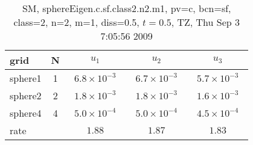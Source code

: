 \begin{table}[hbt]\tableFont %
\begin{center}
\begin{tabular}{|l|c|c|c|c|} \hline 
grid  & N &  $u_1$ & $u_2$ & $u_3$  \\ \hline 
             sphere1 &     1 & ~$6.8\times10^{ -3}$~ & ~$6.7\times10^{ -3}$~ & ~$5.7\times10^{ -3}$~  \\ \hline
             sphere2 &     2 & ~$1.8\times10^{ -3}$~ & ~$1.8\times10^{ -3}$~ & ~$1.6\times10^{ -3}$~  \\ \hline
             sphere4 &     4 & ~$5.0\times10^{ -4}$~ & ~$5.0\times10^{ -4}$~ & ~$4.5\times10^{ -4}$~  \\ \hline
    rate             &       &       $1.88$          &       $1.87$          &       $1.83$           \\ \hline
\end{tabular}
\caption{SM, sphereEigen.c.sf.class2.n2.m1, pv=c, bcn=sf, class=2, n=2, m=1, diss=0.5, $t=0.5$,  TZ, Thu Sep  3  7:05:56 2009}\label{table:sphereEigen.c.sf.class2.n2.m1}
\end{center}
\end{table}
